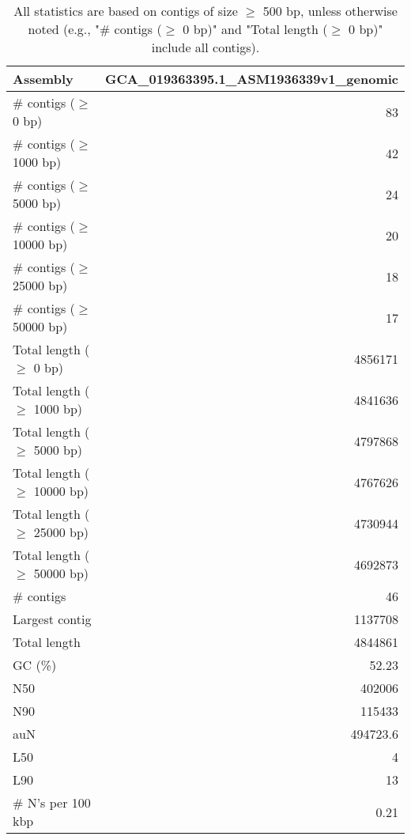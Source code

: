 \documentclass[12pt,a4paper]{article}
\begin{document}
\begin{table}[ht]
\begin{center}
\caption{All statistics are based on contigs of size $\geq$ 500 bp, unless otherwise noted (e.g., "\# contigs ($\geq$ 0 bp)" and "Total length ($\geq$ 0 bp)" include all contigs).}
\begin{tabular}{|l*{1}{|r}|}
\hline
Assembly & GCA\_019363395.1\_ASM1936339v1\_genomic \\ \hline
\# contigs ($\geq$ 0 bp) & 83 \\ \hline
\# contigs ($\geq$ 1000 bp) & 42 \\ \hline
\# contigs ($\geq$ 5000 bp) & 24 \\ \hline
\# contigs ($\geq$ 10000 bp) & 20 \\ \hline
\# contigs ($\geq$ 25000 bp) & 18 \\ \hline
\# contigs ($\geq$ 50000 bp) & 17 \\ \hline
Total length ($\geq$ 0 bp) & 4856171 \\ \hline
Total length ($\geq$ 1000 bp) & 4841636 \\ \hline
Total length ($\geq$ 5000 bp) & 4797868 \\ \hline
Total length ($\geq$ 10000 bp) & 4767626 \\ \hline
Total length ($\geq$ 25000 bp) & 4730944 \\ \hline
Total length ($\geq$ 50000 bp) & 4692873 \\ \hline
\# contigs & 46 \\ \hline
Largest contig & 1137708 \\ \hline
Total length & 4844861 \\ \hline
GC (\%) & 52.23 \\ \hline
N50 & 402006 \\ \hline
N90 & 115433 \\ \hline
auN & 494723.6 \\ \hline
L50 & 4 \\ \hline
L90 & 13 \\ \hline
\# N's per 100 kbp & 0.21 \\ \hline
\end{tabular}
\end{center}
\end{table}
\end{document}
